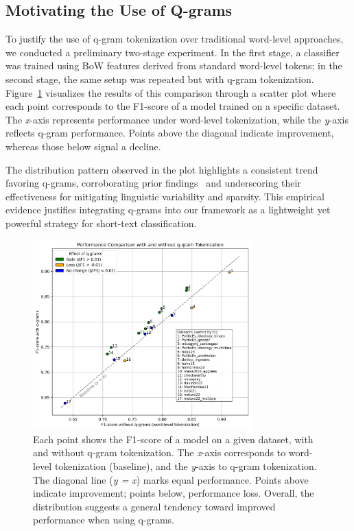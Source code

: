 \documentclass[runningheads,10pt]{llncs}
\begin{document}
\subsection{Motivating the Use of Q-grams}

To justify the use of q-gram tokenization over traditional word-level approaches, we conducted a preliminary two-stage experiment. In the first stage, a classifier was trained using \ac{BoW} features derived from standard word-level tokens; in the second stage, the same setup was repeated but with q-gram tokenization. Figure~\ref{fig:comparison_qgrams} visualizes the results of this comparison through a scatter plot where each point corresponds to the F1-score of a model trained on a specific dataset. The \textit{x}-axis represents performance under word-level tokenization, while the \textit{y}-axis reflects q-gram performance. Points above the diagonal indicate improvement, whereas those below signal a decline.

The distribution pattern observed in the plot highlights a consistent trend favoring q-grams, corroborating prior findings~\cite{tellez2017case,hacohen2020influence} and underscoring their effectiveness for mitigating linguistic variability and sparsity. This empirical evidence justifies integrating q-grams into our framework as a lightweight yet powerful strategy for short-text classification.


\begin{figure}[h]
  \centering
  \includegraphics[width=0.75\textwidth]{comparison_qgrams.png}
  \caption{ Each point shows the F1-score of a model on a given dataset, with and without q-gram tokenization. The \textit{x}-axis corresponds to word-level tokenization (baseline), and the \textit{y}-axis to q-gram tokenization. The diagonal line (\textit{y = x}) marks equal performance. Points above indicate improvement; points below, performance loss. Overall, the distribution suggests a general tendency toward improved performance when using q-grams.}
  \label{fig:comparison_qgrams}
\end{figure}
\end{document}

